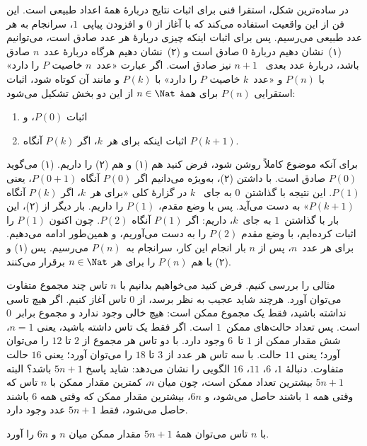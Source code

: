 \documentclass[../../../include/open-logic-section]{subfiles}
\begin{document}


در ساده‌ترین شکل، استقرا فنی برای اثبات نتایج دربارهٔ همهٔ اعداد
طبیعی است. این فن از این واقعیت استفاده می‌کند که با آغاز از $0$ و
افزودن پیاپی~$1$، سرانجام به هر عدد طبیعی می‌رسیم. پس برای اثبات اینکه
چیزی دربارهٔ هر عدد صادق است، می‌توانیم (۱)~نشان دهیم دربارهٔ $0$ صادق
است و (۲)~نشان دهیم هرگاه دربارهٔ عدد~$n$ صادق باشد، دربارهٔ عدد بعدی
~$n+1$ نیز صادق است. اگر عبارت «عدد~$n$ خاصیت $P$ را دارد» با $P(n)$
و «عدد~$k$ خاصیت $P$ را دارد» با $P(k)$ و مانند آن کوتاه شود، اثبات
استقرایی $P(n)$ برای همهٔ $n \in \Nat$ از این دو بخش تشکیل می‌شود:
\begin{enumerate}
\item اثبات $P(0)$، و
\item اثبات اینکه برای هر~$k$، اگر $P(k)$ آنگاه $P(k+1)$.
\end{enumerate}
برای آنکه موضوع کاملاً روشن شود، فرض کنید هم (۱) و هم (۲) را داریم.
(۱) می‌گوید $P(0)$ صادق است. با داشتن (۲)، به‌ویژه می‌دانیم اگر
$P(0)$ آنگاه $P(0+1)$، یعنی $P(1)$. این نتیجه با گذاشتن~$0$ به جای
~$k$ در گزارهٔ کلی «برای هر~$k$، اگر $P(k)$ آنگاه $P(k+1)$» به دست
می‌آید. پس با وضع مقدم، $P(1)$ را داریم. بار دیگر از (۲)، این بار با
گذاشتن~$1$ به جای~$k$، داریم: اگر $P(1)$ آنگاه $P(2)$. چون اکنون
$P(1)$ را اثبات کرده‌ایم، با وضع مقدم $P(2)$ را به دست می‌آوریم، و
همین‌طور ادامه می‌دهیم. برای هر عدد~$n$، پس از $n$ بار انجام این کار،
سرانجام به~$P(n)$ می‌رسیم. پس (۱) و (۲) با هم $P(n)$ را برای هر
$n \in \Nat$ برقرار می‌کنند.

مثالی را بررسی کنیم. فرض کنید می‌خواهیم بدانیم با $n$ تاس چند مجموع
متفاوت می‌توان آورد. هرچند شاید عجیب به نظر برسد، از $0$ تاس آغاز
کنیم. اگر هیچ تاسی نداشته باشید، فقط یک مجموع ممکن است: هیچ خالی
وجود ندارد و مجموع برابر~$0$ است. پس تعداد حالت‌های ممکن~$1$ است. اگر
فقط یک تاس داشته باشید، یعنی $n=1$، شش مقدار ممکن از $1$ تا~$6$ وجود
دارد. با دو تاس هر مجموع از $2$ تا $12$ را می‌توان آورد؛ یعنی $11$
حالت. با سه تاس هر عدد از $3$ تا $18$ را می‌توان آورد؛ یعنی $16$
حالت متفاوت. دنبالهٔ $1$، $6$، $11$، $16$ الگویی را نشان می‌دهد:
شاید پاسخ $5n+1$ باشد؟ البته $5n+1$ بیشترین تعداد ممکن است، چون میان
$n$، کمترین مقدار ممکن با $n$ تاس که وقتی همه $1$ باشند حاصل می‌شود،
و $6n$، بیشترین مقدار ممکن که وقتی همه $6$ باشند حاصل می‌شود، فقط
$5n+1$ عدد وجود دارد.

\begin{thm}
  با $n$ تاس می‌توان همهٔ $5n+1$ مقدار ممکن میان $n$ و $6n$ را آورد.
\end{thm}
\end{document}
